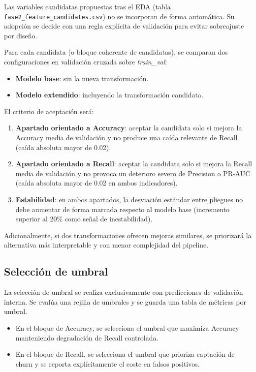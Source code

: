 Las variables candidatas propuestas tras el EDA (tabla \texttt{fase2\_feature\_candidates.csv}) no se incorporan de forma automática. Su adopción se decide con una regla explícita de validación para evitar sobreajuste por diseño.

Para cada candidata (o bloque coherente de candidatas), se comparan dos configuraciones en validación cruzada sobre \textit{train\_val}:

\begin{itemize}
	\item \textbf{Modelo base}: sin la nueva transformación.
	\item \textbf{Modelo extendido}: incluyendo la transformación candidata.
\end{itemize}

El criterio de aceptación será:

\begin{enumerate}
	\item \textbf{Apartado orientado a Accuracy}: aceptar la candidata solo si mejora la Accuracy media de validación y no produce una caída relevante de Recall (caída absoluta mayor de 0.02).
	\item \textbf{Apartado orientado a Recall}: aceptar la candidata solo si mejora la Recall media de validación y no provoca un deterioro severo de Precision o PR-AUC (caída absoluta mayor de 0.02 en ambos indicadores).
	\item \textbf{Estabilidad}: en ambos apartados, la desviación estándar entre pliegues no debe aumentar de forma marcada respecto al modelo base (incremento superior al 20\% como señal de inestabilidad).
\end{enumerate}

Adicionalmente, si dos transformaciones ofrecen mejoras similares, se priorizará la alternativa más interpretable y con menor complejidad del pipeline.

\subsection{Selección de umbral}

La selección de umbral se realiza exclusivamente con predicciones de validación interna. Se evalúa una rejilla de umbrales y se guarda una tabla de métricas por umbral.

\begin{itemize}
	\item En el bloque de Accuracy, se selecciona el umbral que maximiza Accuracy manteniendo degradación de Recall controlada.
	\item En el bloque de Recall, se selecciona el umbral que prioriza captación de churn y se reporta explícitamente el coste en falsos positivos.
\end{itemize}

